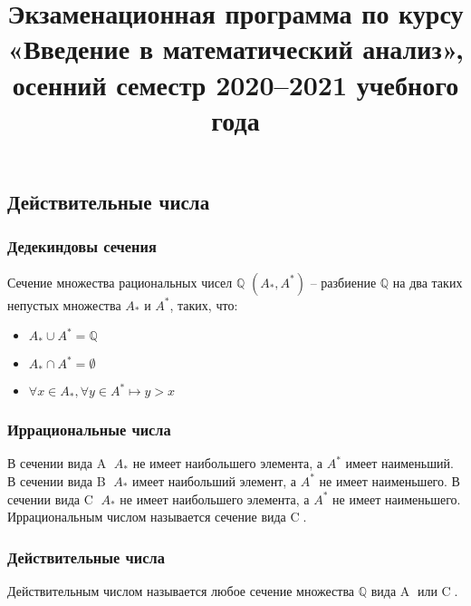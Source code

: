 \documentclass{article}
\title{Экзаменационная программа по курсу «Введение в математический анализ», осенний семестр 2020–2021 учебного года}
\date{}
\begin{document}
    \maketitle

    \newpage

    \section{}
    \subsection*{Действительные  числа}
        \subsubsection*{Дедекиндовы сечения}
        Сечение множества рациональных чисел $\mathbb{Q}$ $(A_*, A^*)$ -- разбиение $\mathbb{Q}$ на два таких непустых множества $A_*$ и $A^*$, таких, что:
        \begin{itemize}
            \item $A_* \cup A^* = \mathbb{Q}$
            \item $A_* \cap A^* = \emptyset$
            \item $\forall x \in A_*, \forall y \in A^* \longmapsto y > x$
        \end{itemize}
        \subsubsection*{Иррациональные числа}
        В сечении вида {\large \textcircled{\small A}} $A_*$ не имеет наибольшего элемента, а $A^*$ имеет наименьший.
        В сечении вида {\large \textcircled{\small B}} $A_*$ имеет наибольший элемент, а $A^*$ не имеет наименьшего.
        В сечении вида {\large \textcircled{\small C}} $A_*$ не имеет наибольшего элемента, а $A^*$ не имеет наименьшего.
        \\
        Иррациональным числом называется сечение вида \textcircled{C}.
        
        \subsubsection*{Действительные числа}
        Действительным числом называется любое сечение множества $\mathbb{Q}$ вида {\large \textcircled{\small A}} или {\large \textcircled{\small C}}.
        
\end{document}
